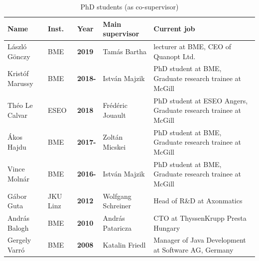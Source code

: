 \documentclass{xetexCV}
\begin{document}
\begin{table}[htb]
\begin{tabular}{@{}lllp{3cm}p{7cm}@{}}
\toprule
\textbf{Name} & \textbf{Inst.} & \textbf{Year} & \textbf{Main supervisor} & \textbf{Current job} \\ \midrule
L\'aszl\'o G\"onczy & BME & \textbf{2019}  & Tam\'as Bartha & lecturer at BME, CEO of Quanopt Ltd.\\
Krist\'of Marussy & BME & \textbf{2018-}  & Istv\'an Majzik & PhD student at BME, Graduate research trainee at McGill \\
Th\'eo Le Calvar & ESEO & \textbf{2018}  & Fr\'ed\'eric Jouault & PhD student at ESEO Angers, Graduate research trainee at McGill \\
\'Akos Hajdu & BME & \textbf{2017-}  & Zolt\'an Micskei & PhD student at BME, Graduate research trainee at McGill \\
Vince Moln\'ar & BME & \textbf{2016-}  & Istv\'an Majzik & PhD student at BME, Graduate research trainee at McGill \\
G\'abor Guta & JKU Linz & \textbf{2012}  & Wolfgang Schreiner & Head of R\&D at Axonmatics \\
Andr\'as Balogh & BME & \textbf{2010}  & Andr\'as Pataricza & CTO at ThyssenKrupp Presta Hungary \\
Gergely Varr\'o & BME & \textbf{2008}  & Katalin Friedl & Manager of Java Development at Software AG, Germany \\ \bottomrule
\end{tabular}
\caption{PhD students (as co-supervisor)}
\label{tab:phd-cosupervised}
\end{table}
\end{document}
